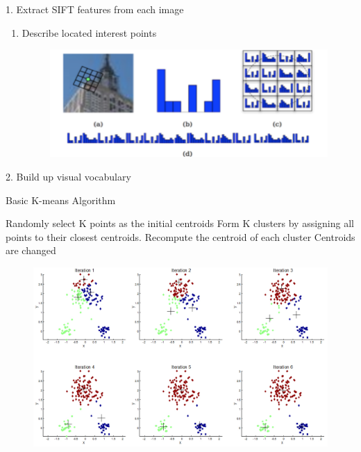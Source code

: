 \begin{frame}{1. Extract SIFT features from each image}
\begin{itemize}
\begin{enumerate}
\begin{columns}
				\end{columns}
			\item Describe located interest points
				\begin{figure}[!ht]
					\centering
					\includegraphics[scale=0.5]{./sift2.png}
				\end{figure}
		\end{enumerate}
\end{itemize}
\end{frame}

\begin{frame}{2. Build up visual vocabulary}

	\begin{algorithm}[H]
	  \caption{Basic K-means Algorithm}
	  \begin {algorithmic}[1]
	  \State Randomly select K points as the initial centroids
	  \Do 
	    \State Form K clusters by assigning all points to their closest centroids.
	    \State Recompute the centroid of each cluster
	  \doWhile Centroids are changed
	  \end{algorithmic}
	\end{algorithm}


	\begin{figure}[!ht]
		\centering
		\includegraphics[scale=0.5]{./cluster.jpg}
	\end{figure}

\end{frame}


